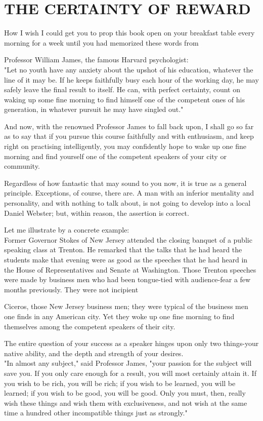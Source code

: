 \documentclass[10pt]{article}
\begin{document}
\section*{THE CERTAINTY OF REWARD}
How I wish I could get you to prop this book open on your breakfast table every morning for a week until you had memorized these words from

Professor William James, the famous Harvard psychologist:\\
"Let no youth have any anxiety about the upshot of his education, whatever the line of it may be. If he keeps faithfully busy each hour of the working day, he may safely leave the final result to itself. He can, with perfect certainty, count on waking up some fine morning to find himself one of the competent ones of his generation, in whatever pursuit he may have singled out."

And now, with the renowned Professor James to fall back upon, I shall go so far as to say that if you pursue this course faithfully and with enthusiasm, and keep right on practising intelligently, you may confidently hope to wake up one fine morning and find yourself one of the competent speakers of your city or community.

Regardless of how fantastic that may sound to you now, it is true as a general principle. Exceptions, of course, there are. A man with an inferior mentality and personality, and with nothing to talk about, is not going to develop into a local Daniel Webster; but, within reason, the assertion is correct.

Let me illustrate by a concrete example:\\
Former Governor Stokes of New Jersey attended the closing banquet of a public speaking class at Trenton. He remarked that the talks that he had heard the students make that evening were as good as the speeches that he had heard in the House of Representatives and Senate at Washington. Those Trenton speeches were made by business men who had been tongue-tied with audience-fear a few months previously. They were not incipient

Ciceros, those New Jersey business men; they were typical of the business men one finds in any American city. Yet they woke up one fine morning to find themselves among the competent speakers of their city.

The entire question of your success as a speaker hinges upon only two things-your native ability, and the depth and strength of your desires.\\
"In almost any subject," said Professor James, "your passion for the subject will save you. If you only care enough for a result, you will most certainly attain it. If you wish to be rich, you will be rich; if you wish to be learned, you will be learned; if you wish to be good, you will be good. Only you must, then, really wish these things and wish them with exclusiveness, and not wish at the same time a hundred other incompatible things just as strongly."
\end{document}
